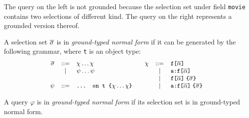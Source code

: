 \noindent The query on the left is not grounded because the selection
set under field \texttt{movie} contains two selections of different
kind. The query on the right represents a grounded version thereof. %

\begin{definition}
A \gql selection set $\overline{\sigma}$ is in \textit{ground-typed normal form}
if it can be generated by the following grammar, where \texttt{t} is an object type: %
\begin{displaymath}\small
	\begin{array}{rcl@{\qquad}rcl}
	\sset & ::= & \chi \ldots \chi & \chi & ::= & \fld \\
	& | & \psi \ldots \psi & & | & \afld\\
	& & & & | & \nfld{\sset}\\
	\psi & ::= & \ifrag{t}{\chi \ldots \chi} & & | & \anfld{\sset}	
	\end{array}
\end{displaymath}

\noindent A \gql query $\varphi$ is in \textit{ground-typed normal form} if its selection set is in ground-typed normal form.

	\end{definition}
\iffalse
\begin{itemize}
	\item If it is a field then its subselections are either all fields or all inline fragments
	\item If it is an inline fragment, then its type condition is an object type and its subselections are only fields, and
	\item Its subselections are in ground-typed normal form.
\end{itemize}
\end{definition}
\fi

